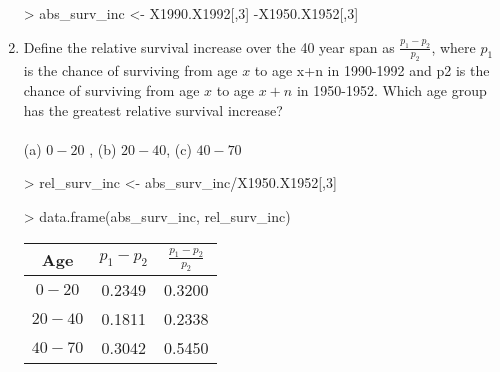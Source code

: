 \documentclass{article}
\begin{document}
\begin{enumerate}
\begin{Schunk}
\begin{Sinput}
> abs_surv_inc <- X1990.X1992[,3] -X1950.X1952[,3]
\end{Sinput}
\end{Schunk}

   \item Define the relative survival increase over the 40 year span as \(\frac{p_1-p_2}{p_2}\), where \(p_1\) is the chance of surviving from age \(x\) to age x+n in 1990-1992 and p2 is the chance of surviving from age \(x\) to age \(x+n\) in 1950-1952. Which age group has the greatest relative survival increase?\\\\
(a) \(0 - 20\) , (b) \(20 - 40\), (c) \(40 -70\)\\

\begin{Schunk}
\begin{Sinput}
> rel_surv_inc <- abs_surv_inc/X1950.X1952[,3]
\end{Sinput}
\end{Schunk}
\begin{Schunk}
\begin{Sinput}
> data.frame(abs_surv_inc, rel_surv_inc)
\end{Sinput}
\end{Schunk}

\begin{table}[ht]
\begin{center}
\begin{tabular}{ccc}
  \hline
 Age & \(p_1 - p_2\) & \(\frac{p_1-p_2}{p_2}\) \\ 
  \hline
\(0-20\) & 0.2349 & 0.3200 \\ 
\(20-40\) & 0.1811 & 0.2338 \\ 
\(40-70\)& 0.3042 & 0.5450 \\ 
   \hline
\end{tabular}
\end{center}
\end{table}


\end{enumerate}
\end{document}
